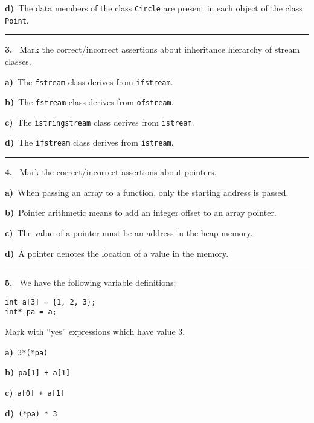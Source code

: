 \begin{multicols}{2}
{\bf d)}\ The data members of the class \verb|Circle| are present in each object of the class \verb|Point|.

\par\smallskip\hrule\par\medskip

{\bf 3. }\ Mark the correct/incorrect assertions about inheritance
hierarchy of stream classes.

{\bf a)}\ The \verb|fstream| class derives from \verb|ifstream|.

{\bf b)}\ The \verb|fstream| class derives from \verb|ofstream|.

{\bf c)}\ The \verb|istringstream| class derives from \verb|istream|.

{\bf d)}\ The \verb|ifstream| class derives from \verb|istream|.

\par\smallskip\hrule\par\medskip

{\bf 4. }\ Mark the correct/incorrect assertions about pointers.

{\bf a)}\ When passing an array to a function, only the starting address is passed.

{\bf b)}\ Pointer arithmetic means to add an integer offset to an array pointer.

{\bf c)}\ The value of a pointer must be an address in the heap memory.

{\bf d)}\ A pointer denotes the location of a value in the memory.

\par\smallskip\hrule\par\medskip

{\bf 5. }\ We have the following variable definitions:
 \vspace{-3mm}\begin{verbatim}
int a[3] = {1, 2, 3};
int* pa = a;
 \end{verbatim}\vspace{-6mm}
Mark with ``yes'' expressions which have value 3.

{\bf a)}\ \verb|3*(*pa)|

{\bf b)}\ \verb|pa[1] + a[1]|

{\bf c)}\ \verb|a[0] + a[1]|

{\bf d)}\ \verb|(*pa) * 3|

\end{multicols}


